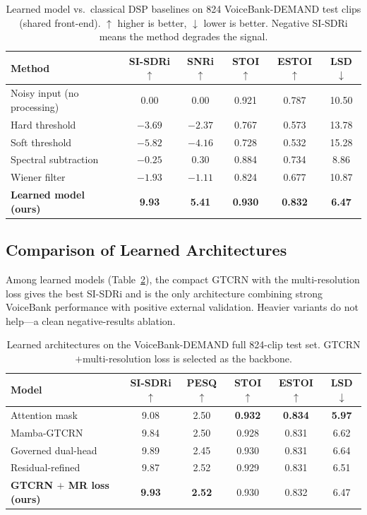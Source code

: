 \documentclass[runningheads]{llncs}
\newcommand{\pos}[1]{\textcolor{good}{\textbf{#1}}}
\newcommand{\bad}[1]{\textcolor{bad}{#1}}
\begin{document}
\begin{table}[t]
\centering
\caption{Learned model vs.\ classical DSP baselines on 824 VoiceBank-DEMAND
test clips (shared front-end). $\uparrow$ higher is better, $\downarrow$ lower
is better. Negative SI-SDRi means the method degrades the signal.}
\label{tab:main}
\setlength{\tabcolsep}{6pt}
\begin{tabular}{lccccc}
\toprule
Method & SI-SDRi$\uparrow$ & SNRi$\uparrow$ & STOI$\uparrow$ & ESTOI$\uparrow$ & LSD$\downarrow$ \\
\midrule
Noisy input (no processing) & 0.00 & 0.00 & 0.921 & 0.787 & 10.50 \\
Hard threshold        & \bad{$-3.69$} & \bad{$-2.37$} & 0.767 & 0.573 & 13.78 \\
Soft threshold        & \bad{$-5.82$} & \bad{$-4.16$} & 0.728 & 0.532 & 15.28 \\
Spectral subtraction  & \bad{$-0.25$} & 0.30 & 0.884 & 0.734 & 8.86 \\
Wiener filter         & \bad{$-1.93$} & \bad{$-1.11$} & 0.824 & 0.677 & 10.87 \\
\midrule
\textbf{Learned model (ours)} & \pos{9.93} & \pos{5.41} & \pos{0.930} & \pos{0.832} & \pos{6.47} \\
\bottomrule
\end{tabular}
\end{table}

\subsection{Comparison of Learned Architectures}
Among learned models (Table~\ref{tab:learned}), the compact GTCRN with the
multi-resolution loss gives the best SI-SDRi and is the only architecture
combining strong VoiceBank performance with positive external validation.
Heavier variants do not help---a clean negative-results ablation.

\begin{table}[t]
\centering
\caption{Learned architectures on the VoiceBank-DEMAND full 824-clip test set.
GTCRN$+$multi-resolution loss is selected as the backbone.}
\label{tab:learned}
\setlength{\tabcolsep}{6pt}
\begin{tabular}{lccccc}
\toprule
Model & SI-SDRi$\uparrow$ & PESQ$\uparrow$ & STOI$\uparrow$ & ESTOI$\uparrow$ & LSD$\downarrow$ \\
\midrule
Attention mask            & 9.08 & 2.50 & \textbf{0.932} & \textbf{0.834} & \textbf{5.97} \\
Mamba-GTCRN               & 9.84 & 2.50 & 0.928 & 0.831 & 6.62 \\
Governed dual-head        & 9.89 & 2.45 & 0.930 & 0.831 & 6.64 \\
Residual-refined          & 9.87 & 2.52 & 0.929 & 0.831 & 6.51 \\
\textbf{GTCRN $+$ MR loss (ours)} & \textbf{9.93} & \textbf{2.52} & 0.930 & 0.832 & 6.47 \\
\bottomrule
\end{tabular}
\end{table}
\end{document}
